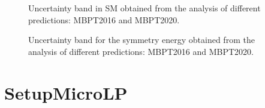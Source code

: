 \documentclass[letterpaper,10pt,english]{sphinxmanual}
\begin{document}
\begin{figure}[htbp]
\centering
\capstart

\noindent{}
\caption{Uncertainty band in SM obtained from the analysis of different predictions: MBPT\sphinxhyphen{}2016 and MBPT\sphinxhyphen{}2020.}\label{\detokenize{source/api/setup_micro_matter_band:id2}}\end{figure}

\begin{figure}[htbp]
\centering
\capstart

\noindent{}
\caption{Uncertainty band for the symmetry energy obtained from the analysis of different predictions: MBPT\sphinxhyphen{}2016 and MBPT\sphinxhyphen{}2020.}\label{\detokenize{source/api/setup_micro_matter_band:id3}}\end{figure}

\sphinxstepscope


\section{SetupMicroLP}
\label{\detokenize{source/api/setup_micro_LP:setupmicrolp}}\label{\detokenize{source/api/setup_micro_LP::doc}}\label{\detokenize{source/api/setup_micro_LP:module-nucleardatapy.setup_micro_LP}}
\end{document}
